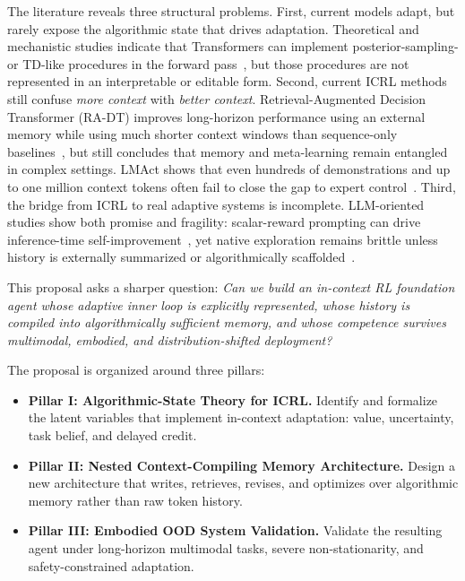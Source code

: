 \documentclass[10pt,twocolumn,letterpaper]{article}
\begin{document}
The literature reveals three structural problems. First, current models adapt, but rarely expose the algorithmic state that drives adaptation. Theoretical and mechanistic studies indicate that Transformers can implement posterior-sampling- or TD-like procedures in the forward pass~\cite{lin2023decisionmakers,wang2024td,demircan2024sae}, but those procedures are not represented in an interpretable or editable form. Second, current ICRL methods still confuse \emph{more context} with \emph{better context}. Retrieval-Augmented Decision Transformer (RA-DT) improves long-horizon performance using an external memory while using much shorter context windows than sequence-only baselines~\cite{schmied2024radt}, but still concludes that memory and meta-learning remain entangled in complex settings. LMAct shows that even hundreds of demonstrations and up to one million context tokens often fail to close the gap to expert control~\cite{ruoss2024lmact}. Third, the bridge from ICRL to real adaptive systems is incomplete. LLM-oriented studies show both promise and fragility: scalar-reward prompting can drive inference-time self-improvement~\cite{song2025reward}, yet native exploration remains brittle unless history is externally summarized or algorithmically scaffolded~\cite{krishnamurthy2024explore,nie2024evolve}.

This proposal asks a sharper question: \emph{Can we build an in-context RL foundation agent whose adaptive inner loop is explicitly represented, whose history is compiled into algorithmically sufficient memory, and whose competence survives multimodal, embodied, and distribution-shifted deployment?}

The proposal is organized around three pillars:
\begin{itemize}[leftmargin=1.2em]
\item \textbf{Pillar I: Algorithmic-State Theory for ICRL.} Identify and formalize the latent variables that implement in-context adaptation: value, uncertainty, task belief, and delayed credit.
\item \textbf{Pillar II: Nested Context-Compiling Memory Architecture.} Design a new architecture that writes, retrieves, revises, and optimizes over algorithmic memory rather than raw token history.
\item \textbf{Pillar III: Embodied OOD System Validation.} Validate the resulting agent under long-horizon multimodal tasks, severe non-stationarity, and safety-constrained adaptation.
\end{itemize}
\end{document}
